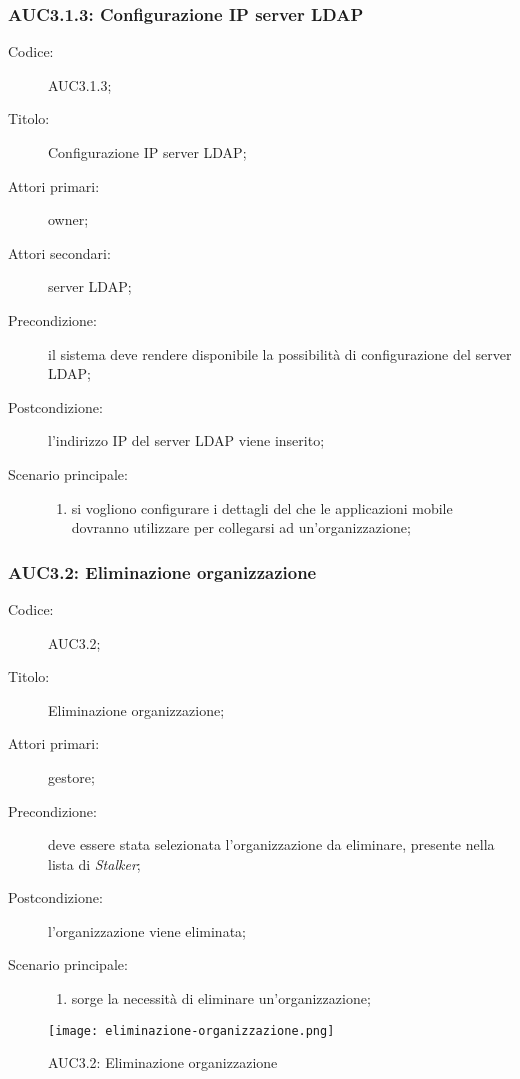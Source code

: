 \documentclass[../../../analisi-dei-requisiti.tex]{subfiles}
\begin{document}
\subsubsection{AUC3.1.3: Configurazione IP server LDAP}%
\label{subs:AUC3.1.3}
\begin{description}
  \item[Codice:] AUC3.1.3;
  \item[Titolo:] Configurazione IP server LDAP\@;
  \item[Attori primari:] owner;
  \item[Attori secondari:] server LDAP\@;
  \item[Precondizione:] il sistema deve rendere disponibile la possibilità di configurazione del server LDAP\@;
  \item[Postcondizione:] l'indirizzo IP del server LDAP viene inserito;
  \item[Scenario principale:]
        \begin{enumerate}
          \item si vogliono configurare i dettagli del  che le applicazioni mobile dovranno utilizzare per collegarsi ad un'organizzazione;
        \end{enumerate}
\end{description}

\subsubsection{AUC3.2: Eliminazione organizzazione}%
\label{subs:AUC3.2}
\begin{description}
  \item[Codice:] AUC3.2;
  \item[Titolo:] Eliminazione organizzazione;
  \item[Attori primari:] gestore;
  \item[Precondizione:] deve essere stata selezionata l'organizzazione da eliminare, presente nella lista di \emph{Stalker};
  \item[Postcondizione:] l'organizzazione viene eliminata;
  \item[Scenario principale:]
        \begin{enumerate}
          \item sorge la necessità di eliminare un'organizzazione;
        \end{enumerate}
\end{description}

\begin{figure}[H]
  \centering
  \texttt{[image: eliminazione-organizzazione.png]}
  \caption{AUC3.2: Eliminazione organizzazione}%
  \label{fig:AUC3.2}
\end{figure}
\end{document}
